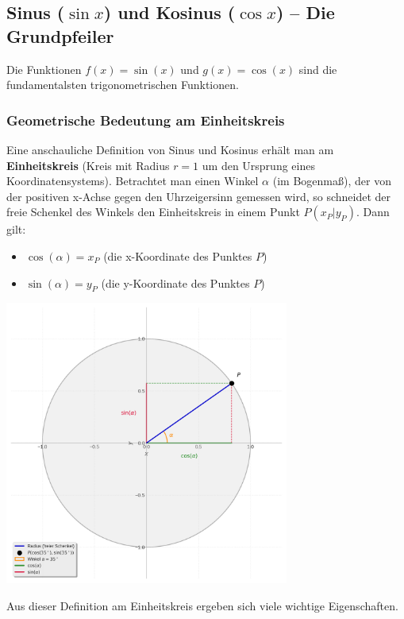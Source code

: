 \subsection{Sinus ($\sin x$) und Kosinus ($\cos x$) – Die Grundpfeiler}
\label{subsec:sinus_kosinus_grundlagen}

Die Funktionen $f(x)=\sin(x)$ und $g(x)=\cos(x)$ sind die fundamentalsten trigonometrischen Funktionen.

\subsubsection{Geometrische Bedeutung am Einheitskreis}
Eine anschauliche Definition von Sinus und Kosinus erhält man am \textbf{Einheitskreis} (Kreis mit Radius $r=1$ um den Ursprung eines Koordinatensystems).
Betrachtet man einen Winkel $\alpha$ (im Bogenmaß), der von der positiven x-Achse gegen den Uhrzeigersinn gemessen wird, so schneidet der freie Schenkel des Winkels den Einheitskreis in einem Punkt $P(x_P|y_P)$. Dann gilt:
\begin{itemize}
    \item $\cos(\alpha) = x_P$ (die x-Koordinate des Punktes $P$)
    \item $\sin(\alpha) = y_P$ (die y-Koordinate des Punktes $P$)
\end{itemize}
\begin{center}
    \includegraphics[width=0.7\textwidth]{grafiken/Trig_Einheitskreis.png}
    \label{fig:einheitskreis}
\end{center}
Aus dieser Definition am Einheitskreis ergeben sich viele wichtige Eigenschaften.

